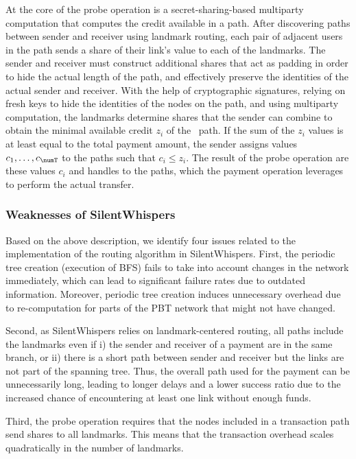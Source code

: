 At the core of the probe operation is a secret-sharing-based multiparty computation 
that computes the credit available in a path. 
After discovering paths between sender and receiver using landmark routing, 
each pair of adjacent users in the path 
sends a share of their link's value to each of the landmarks. The sender and receiver must  
construct additional shares that act as padding in order 
to hide the actual length of the path, and effectively preserve the identities of 
the actual sender and receiver. 
With the help of cryptographic signatures, relying on fresh keys to hide the identities of the nodes on the path,
and using multiparty computation, the landmarks determine shares that the sender can combine to obtain the minimal available credit $z_i$ of the \ith\ path. 
If the sum of the $z_i$ values 
is at least equal to the total payment amount, the sender assigns values $c_1, \ldots , c_{\numT}$ to the paths such that $c_i \leq z_i$. 
The result of the probe operation are these values $c_i$ and handles to
the paths,
which the payment operation leverages to perform the actual transfer. 

\subsubsection{Weaknesses of SilentWhispers}
Based on the above description, we identify four issues related to the implementation of 
the routing algorithm in SilentWhispers. 
First, the periodic tree creation (execution of BFS) 
fails to take into account changes in the network immediately, 
which can lead to significant failure rates due to outdated information. 
 Moreover, periodic tree creation 
 induces unnecessary overhead due to re-computation for parts of the PBT network that might not have changed.  

Second, as SilentWhispers relies on landmark-centered routing, all paths include the landmarks even if i) the 
sender and receiver of a payment are in the same branch, or 
ii) there is a short path between sender and receiver but the links are not part of the spanning tree.  
Thus, the overall path used for the payment 
can be unnecessarily long, leading to longer delays 
and a lower success ratio due to the increased chance of encountering 
at least one link without enough funds. 

Third, the probe operation requires that the nodes  included in a transaction path send 
shares to all landmarks. This means that the transaction overhead scales 
quadratically in the number of landmarks. 

